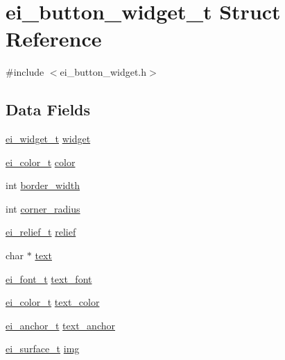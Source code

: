 \hypertarget{structei__button__widget__t}{\section{ei\-\_\-button\-\_\-widget\-\_\-t Struct Reference}
\label{structei__button__widget__t}
}


{\ttfamily \#include $<$ei\-\_\-button\-\_\-widget.\-h$>$}

\subsection*{Data Fields}
\begin{DoxyCompactItemize}
\item 
\hyperlink{structei__widget__t}{ei\-\_\-widget\-\_\-t} \hyperlink{structei__button__widget__t_afe19016fcaae2769f18f3b1d73c5579d}{widget}
\item 
\hyperlink{structei__color__t}{ei\-\_\-color\-\_\-t} \hyperlink{structei__button__widget__t_a4fda3db8c1feae5c9af783ccda98bdaf}{color}
\item 
int \hyperlink{structei__button__widget__t_aa2ceeafdf9be60f4d5ef5bb58aa20ca7}{border\-\_\-width}
\item 
int \hyperlink{structei__button__widget__t_a39201d2e78e7d968ba66ceaa34d40f87}{corner\-\_\-radius}
\item 
\hyperlink{ei__types_8h_aa79a32b1d8ece0e44cfa394e870b270b}{ei\-\_\-relief\-\_\-t} \hyperlink{structei__button__widget__t_a347faf83fbd41810b382eba99c7e9e38}{relief}
\item 
char $\ast$ \hyperlink{structei__button__widget__t_a80805109b78e9cf342d2a8c352cfe972}{text}
\item 
\hyperlink{ei__types_8h_a22c8198e4d641e4bc67bb17f9c6bcda7}{ei\-\_\-font\-\_\-t} \hyperlink{structei__button__widget__t_ae5e7655fbfdf95430f00a13bfd0bdad4}{text\-\_\-font}
\item 
\hyperlink{structei__color__t}{ei\-\_\-color\-\_\-t} \hyperlink{structei__button__widget__t_a52b3ab3bbf1c0705ef749c34225c074f}{text\-\_\-color}
\item 
\hyperlink{ei__types_8h_a3852c963af609d31d7cfcff79c4c8450}{ei\-\_\-anchor\-\_\-t} \hyperlink{structei__button__widget__t_a19d4c3693b903536fc72dc911e36dc9f}{text\-\_\-anchor}
\item 
\hyperlink{hw__interface_8h_ad9970ae727c438faaf09c58c5defb796}{ei\-\_\-surface\-\_\-t} \hyperlink{structei__button__widget__t_af4b80571568794c12bd89b0c241b6f59}{img}

\end{DoxyCompactItemize}
